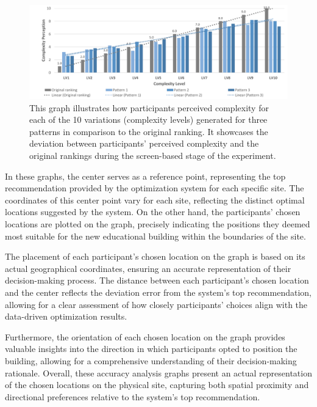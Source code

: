         \begin{figure}[htb]
          \centering
          \includegraphics[width= \linewidth, trim=0 0 0 0]{Images/ComplexityPerceptionPerLevel}
          \caption{This graph illustrates how participants perceived complexity for each of the 10 variations (complexity levels) generated for three patterns in comparison to the original ranking. It showcases the deviation between participants' perceived complexity and the original rankings during the screen-based stage of the experiment.}
          \label{fig:ComplexityPerceptionPerLevel}
        \end{figure}

In these graphs, the center serves as a reference point, representing the top recommendation provided by the optimization system for each specific site.
The coordinates of this center point vary for each site, reflecting the distinct optimal locations suggested by the system.
On the other hand, the participants' chosen locations are plotted on the graph, precisely indicating the positions they deemed most suitable for the new educational building within the boundaries of the site.

The placement of each participant's chosen location on the graph is based on its actual geographical coordinates, ensuring an accurate representation of their decision-making process.
The distance between each participant's chosen location and the center reflects the deviation error from the system's top recommendation, allowing for a clear assessment of how closely participants' choices align with the data-driven optimization results.

Furthermore, the orientation of each chosen location on the graph provides valuable insights into the direction in which participants opted to position the building, allowing for a comprehensive understanding of their decision-making rationale.
Overall, these accuracy analysis graphs present an actual representation of the chosen locations on the physical site, capturing both spatial proximity and directional preferences relative to the system's top recommendation.

